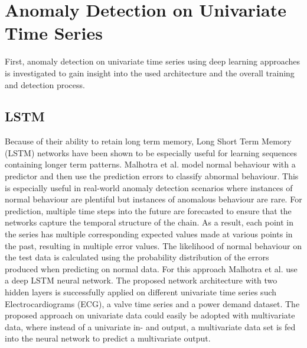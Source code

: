 %
%
%
%

\section{Anomaly Detection on Univariate Time Series} \label{Anomaly Detection on Univariate Time Series}

First, anomaly detection on univariate time series using deep learning approaches is investigated to gain insight into the used architecture and the overall training and detection process. 

\subsection{LSTM}

Because of their ability to retain long term memory, Long Short Term Memory (LSTM) networks have been shown to be especially useful for learning sequences containing longer term patterns. Malhotra et al. \parencite*{Malhotra2015} model normal behaviour with a predictor and then use the prediction errors to classify abnormal behaviour. This is especially useful in real-world anomaly detection scenarios where instances of normal behaviour are plentiful but instances of anomalous behaviour are rare. For prediction, multiple time steps into the future are forecasted to ensure that the networks capture the temporal structure of the chain. As a result, each point in the series has multiple corresponding expected values made at various points in the past, resulting in multiple error values. The likelihood of normal behaviour on the test data is calculated using the probability distribution of the errors produced when predicting on normal data. For this approach Malhotra et al. use a deep LSTM neural network. The proposed network architecture with two hidden layers is successfully applied on different univariate time series such Electrocardiograms (ECG), a valve time series and a power demand dataset. The proposed approach on univariate data could easily be adopted with multivariate data, where instead of a univariate in- and output, a multivariate data set is fed into the neural network to predict a multivariate output. 

